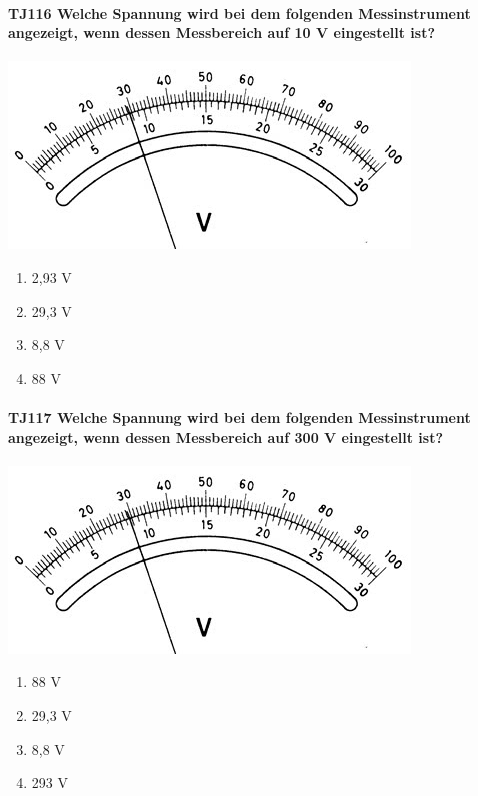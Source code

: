\documentclass[8pt]{article}
\begin{document}
\paragraph*{TJ116 Welche Spannung wird bei dem folgenden Messinstrument angezeigt, wenn dessen Messbereich auf 10 V eingestellt ist?}
\begin{center}
	\begin{minipage}{\linewidth}
		\centering
		\includegraphics[scale=1.0]{pics/tj116_a.jpg}
	\end{minipage}
\end{center}
\begin{enumerate}[nolistsep,label=\Alph*]
\item 2,93 V
\item 29,3 V
\item 8,8 V
\item 88 V
\end{enumerate}

\paragraph*{TJ117 Welche Spannung wird bei dem folgenden Messinstrument angezeigt, wenn dessen Messbereich auf 300 V eingestellt ist?}
\begin{center}
	\begin{minipage}{\linewidth}
		\centering
		\includegraphics[scale=1.0]{pics/tj117_a.jpg}
	\end{minipage}
\end{center}
\begin{enumerate}[nolistsep,label=\Alph*]
\item 88 V
\item 29,3 V
\item 8,8 V
\item 293 V
\end{enumerate}
\end{document}
